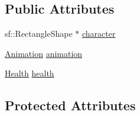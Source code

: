 \subsection*{Public Attributes}
\begin{DoxyCompactItemize}
\item 
sf\+::\+Rectangle\+Shape $\ast$ \hyperlink{classAI_a4cf1d3f0c4e6342f7b78dbd143ec915f}{character}
\item 
\hyperlink{classAnimation}{Animation} \hyperlink{classAI_a6669dc8af30f760cbeca3008727913d0}{animation}
\item 
\hyperlink{classHealth}{Health} \hyperlink{classAI_a073d65bf0b0b08b31710cf9743d2e364}{health}
\end{DoxyCompactItemize}
\subsection*{Protected Attributes}
